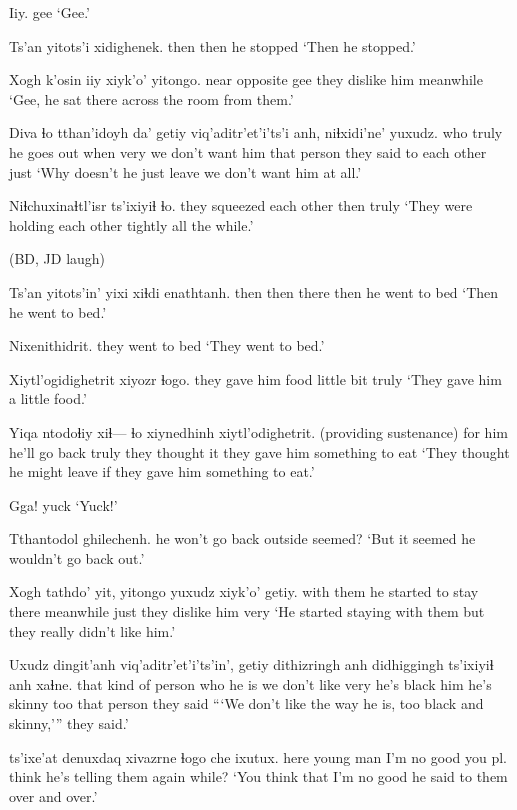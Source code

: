 \documentclass[12pt]{article}
\begin{document}
\gll Iiy.
gee
\glt `Gee.'
\glend

\gll Ts'an yitots'i xidighenek.
then then {he stopped}
\glt `Then he stopped.'
\glend

\gll Xogh k'osin iiy xiyk'o' yitongo.
near opposite gee {they dislike him} meanwhile
\glt `Gee, he sat there across the room from them.'
\glend

\gll Diva ɬo tthan'idoyh da' getiy viq'aditr'et'i'ts'i anh, niɬxidi'ne' yuxudz. 
who truly {he goes out} when very {we don't want him} {that person} {they said to each other} just
\glt `Why doesn't he just leave we don't want him at all.'
\glend

\gll Niɬchuxinaɬtl'isr ts'ixiyiɬ ɬo.
{they squeezed each other} then truly
\glt `They were holding each other tightly all the while.'
\glend

(BD, JD laugh)

\gll Ts'an yitots'in' yixi xiɬdi enathtanh.
then then there then {he went to bed}
\glt `Then he went to bed.'
\glend

\gll Nixenithidrit.
{{they went to bed}}
\glt `They went to bed.'
\glend

\gll Xiytl'ogidighetrit xiyozr ɬogo.
{they gave him food} {little bit} truly
\glt `They gave him a little food.'
\glend

\gll Yiqa ntodoɬiy xiɬ--- ɬo xiynedhinh xiytl'odighetrit.
{(providing sustenance) for him} {he'll go back} {} truly {they thought it} {they gave him something to eat}
\glt `They thought he might leave if they gave him something to eat.'
\glend

\gll Gga!
yuck
\glt `Yuck!'
\glend

\gll Tthantodol ghilechenh.
{he won't go back outside} seemed?
\glt `But it seemed he wouldn't go back out.'
\glend

\gll Xogh tathdo' yit, yitongo yuxudz xiyk'o' getiy.
{with them} {he started to stay} there meanwhile just {they dislike him} very
\glt `He started staying with them but they really didn't like him.'
\glend

\gll Uxudz dingit'anh viq'aditr'et'i'ts'in', getiy dithizringh anh didhiggingh ts'ixiyiɬ anh xaɬne.
{that kind of} {person who he is} {we don't like} very {he's black} him {he's skinny} too {that person} {they said}
\glt ```We don't like the way he is, too black and skinny,''' they said.'
\glend

 ts'ixe'at denuxdaq xivazrne ɬogo che ixutux.
here {young man} {I'm no good} {you pl. think} {he's telling them} again {while?}
\glt `You think that I'm no good he said to them over and over.'
\glend
\end{document}
